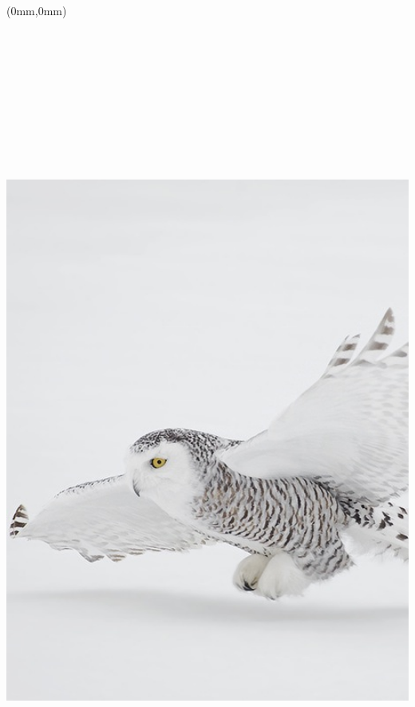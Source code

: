 \documentclass[letterpaper,11pt]{memoir}
\begin{document}
\frontmatter

\pagestyle{empty}

\textblockorigin{0mm}{0mm}
\setlength{\parindent}{0mm}

\begin{textblock*}{216mm}(0mm,0mm)
  \includegraphics[height=11in,keepaspectratio=true]{harfang.jpg} \\
\end{textblock*}
\end{document}
